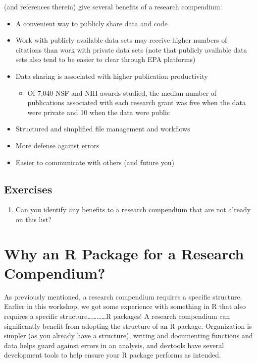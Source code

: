 \documentclass[
]{book}
\providecommand{\tightlist}{%
  \setlength{\itemsep}{0pt}\setlength{\parskip}{0pt}}
\begin{document}
\citet{marwick2018packaging} (and references therein) give several benefits of a research compendium:

\begin{itemize}
\tightlist
\item
  A convenient way to publicly share data and code
\item
  Work with publicly available data sets may receive higher numbers of citations than work with private data sets (note that publicly available data sets also tend to be easier to clear through EPA platforms)
\item
  Data sharing is associated with higher publication productivity

  \begin{itemize}
  \tightlist
  \item
    Of 7,040 NSF and NIH awards studied, the median number of publications associated with each research grant was five when the data were private and 10 when the data were public
  \end{itemize}
\item
  Structured and simplified file management and workflows
\item
  More defense against errors
\item
  Easier to communicate with others (and future you)
\end{itemize}

\hypertarget{ex-set7}{%
\subsection{Exercises}\label{ex-set7}}

\begin{enumerate}
\def\labelenumi{\arabic{enumi}.}
\tightlist
\item
  Can you identify any benefits to a research compendium that are not already on this list?
\end{enumerate}

\hypertarget{why-r-pack-for-rc}{%
\section{Why an R Package for a Research Compendium?}\label{why-r-pack-for-rc}}

As previously mentioned, a research compendium requires a specific structure. Earlier in this workshop, we got some experience with something in R that also requires a specific structure\ldots\ldots\ldots\ldots R packages! A research compendium can significantly benefit from adopting the structure of an R package. Organization is simpler (as you already have a structure), writing and documenting functions and data helps guard against errors in an analysis, and devtools have several development tools to help ensure your R package performs as intended.
\end{document}
